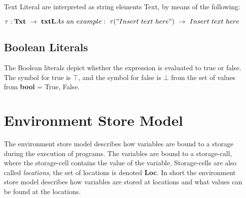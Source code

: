   
  Text Literal are interpreted as string elements Text, by means of the following:
  
  \begin{math}
  	\tau : \textbf{Txt} \ \rightarrow \ \textbf{txtL} \newline
  	As \ an \ example: \ \tau("Insert \ text \ here") \ \rightarrow \ Insert \ text \ here
  \end{math}
  
  \subsection{Boolean Literals}
  The Boolean literals depict whether the expression is evaluated to true or false. The symbol for true is \begin{math} \top \end{math}, and the symbol for false is \begin{math} \bot \end{math} from the set of values from \textbf{bool} = {True, False}.
  
  
  
  
  
  \section{Environment Store Model}
  The environment store model describes how variables are bound to a storage during the execution of programs. The variables are bound to a storage-call, where the storage-cell contains the value of the variable. Storage-cells are also called \textit{locations}, the set of locations is denoted \textbf{Loc}. In short the environment store model describes how variables are stored at locations and what values can be found at the locations.
  
